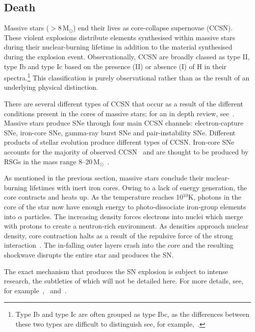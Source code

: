 
\subsection{Death} %
\label{sub:death}

Massive stars ($>$8\,M$_{\odot}$) end their lives as core-collapse supernovae (CCSN).
These violent explosions distribute elements synthesised within massive stars during their nuclear-burning lifetime in addition to the material synthesised during the explosion event.
Observationally, CCSN are broadly classed as type II, type Ib and type Ic based on the presence (II) or absence (I) of H in their spectra.\footnote{Type Ib and type Ic are often grouped as type Ibc, as the differences between these two types are difficult to distinguish see, for example,~\citep{Eldridge13}.}
This classification is purely observational rather than as the result of an underlying physical distinction.


There are several different types of CCSN that occur as a result of the different conditions present in the cores of massive stars; for an in depth review, see~\cite{Janka12}.
Massive stars produce SNe through four main CCSN channels: electron-capture SNe, iron-core SNe, gamma-ray burst SNe and pair-instability SNe.
Different products of stellar evolution produce different types of CCSN.
Iron-core SNe accounts for the majority of observed CCSN~\citep{Smartt09,Janka12,Eldridge13,2014ARA&A..52..487S} and are thought to be produced by RSGs in the mass range 8--20\,M$_{\odot}$~\citep{Poelarends08,Smartt09}.


As mentioned in the previous section, massive stars conclude their nuclear-burning lifetimes with inert iron cores.
Owing to a lack of energy generation, the core contracts and heats up.
As the temperature reaches 10$^{10}$K, photons in the core of the star now have enough energy to photo-dissociate iron-group elements into $\alpha$ particles.
The increasing density forces electrons into nuclei which merge with protons to create a neutron-rich environment.
As densities approach nuclear density, core contraction halts as a result of the repulsive force of the strong interaction~\citep{Janka12}.
The in-falling outer layers crash into the core and the resulting shockwave disrupts the entire star and produces the SN.

The exact mechanism that produces the SN explosion is subject to intense research, the subtleties of which will not be detailed here.
For more details, see, for example~\cite{Janka12},~\citep{Burrows13} and~\citep{2015PASA...32....9F}.

